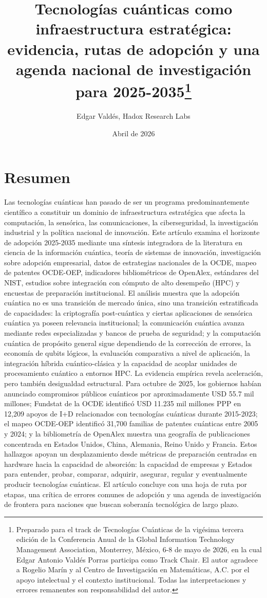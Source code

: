 \documentclass[
  11pt,
  letterpaper,
]{article}
\title{Tecnologías cuánticas como infraestructura estratégica:
evidencia, rutas de adopción y una agenda nacional de investigación para
2025-2035\thanks{Preparado para el track de Tecnologías Cuánticas de la
vigésima tercera edición de la Conferencia Anual de la Global
Information Technology Management Association, Monterrey, México, 6-8 de
mayo de 2026, en la cual Edgar Antonio Valdés Porras participa como
Track Chair. El autor agradece a Rogelio Marín y al Centro de
Investigación en Matemáticas, A.C. por el apoyo intelectual y el
contexto institucional. Todas las interpretaciones y errores remanentes
son responsabilidad del autor.}}
\author{Edgar Valdés, Hadox Research Labs}
\date{Abril de 2026}
\begin{document}
\maketitle

\section{Resumen}\label{resumen}

Las tecnologías cuánticas han pasado de ser un programa
predominantemente científico a constituir un dominio de infraestructura
estratégica que afecta la computación, la sensórica, las comunicaciones,
la ciberseguridad, la investigación industrial y la política nacional de
innovación. Este artículo examina el horizonte de adopción 2025-2035
mediante una síntesis integradora de la literatura en ciencia de la
información cuántica, teoría de sistemas de innovación, investigación
sobre adopción empresarial, datos de estrategias nacionales de la OCDE,
mapeo de patentes OCDE-OEP, indicadores bibliométricos de OpenAlex,
estándares del NIST, estudios sobre integración con cómputo de alto
desempeño (HPC) y encuestas de preparación institucional. El análisis
muestra que la adopción cuántica no es una transición de mercado única,
sino una transición estratificada de capacidades: la criptografía
post-cuántica y ciertas aplicaciones de sensórica cuántica ya poseen
relevancia institucional; la comunicación cuántica avanza mediante redes
especializadas y bancos de prueba de seguridad; y la computación
cuántica de propósito general sigue dependiendo de la corrección de
errores, la economía de qubits lógicos, la evaluación comparativa a
nivel de aplicación, la integración híbrida cuántico-clásica y la
capacidad de acoplar unidades de procesamiento cuántico a entornos HPC.
La evidencia empírica revela aceleración, pero también desigualdad
estructural. Para octubre de 2025, los gobiernos habían anunciado
compromisos públicos cuánticos por aproximadamente USD 55.7 mil
millones; Fundstat de la OCDE identificó USD 11.235 mil millones PPP en
12,209 apoyos de I+D relacionados con tecnologías cuánticas durante
2015-2023; el mapeo OCDE-OEP identificó 31,700 familias de patentes
cuánticas entre 2005 y 2024; y la bibliometría de OpenAlex muestra una
geografía de publicaciones concentrada en Estados Unidos, China,
Alemania, Reino Unido y Francia. Estos hallazgos apoyan un
desplazamiento desde métricas de preparación centradas en hardware hacia
la capacidad de absorción: la capacidad de empresas y Estados para
entender, probar, comparar, adquirir, asegurar, regular y eventualmente
producir tecnologías cuánticas. El artículo concluye con una hoja de
ruta por etapas, una crítica de errores comunes de adopción y una agenda
de investigación de frontera para naciones que buscan soberanía
tecnológica de largo plazo.
\end{document}
